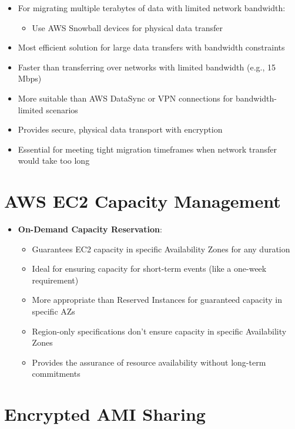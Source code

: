 \documentclass[11pt,a4paper]{report}
\begin{document}
\begin{itemize}
\begin{itemize}
  \item For migrating multiple terabytes of data with limited network bandwidth:
\begin{itemize}
  \item Use AWS Snowball devices for physical data transfer
\end{itemize}
  \item Most efficient solution for large data transfers with bandwidth constraints
  \item Faster than transferring over networks with limited bandwidth (e.g., 15 Mbps)
  \item More suitable than AWS DataSync or VPN connections for bandwidth-limited scenarios
  \item Provides secure, physical data transport with encryption
  \item Essential for meeting tight migration timeframes when network transfer would take too long
\end{itemize}
\end{itemize}

\section{AWS EC2 Capacity Management}

\begin{itemize}
  \item \textbf{On-Demand Capacity Reservation}:
\begin{itemize}
  \item Guarantees EC2 capacity in specific Availability Zones for any duration
  \item Ideal for ensuring capacity for short-term events (like a one-week requirement)
  \item More appropriate than Reserved Instances for guaranteed capacity in specific AZs
  \item Region-only specifications don't ensure capacity in specific Availability Zones
  \item Provides the assurance of resource availability without long-term commitments
\end{itemize}
\end{itemize}


\section{Encrypted AMI Sharing}
\end{document}
